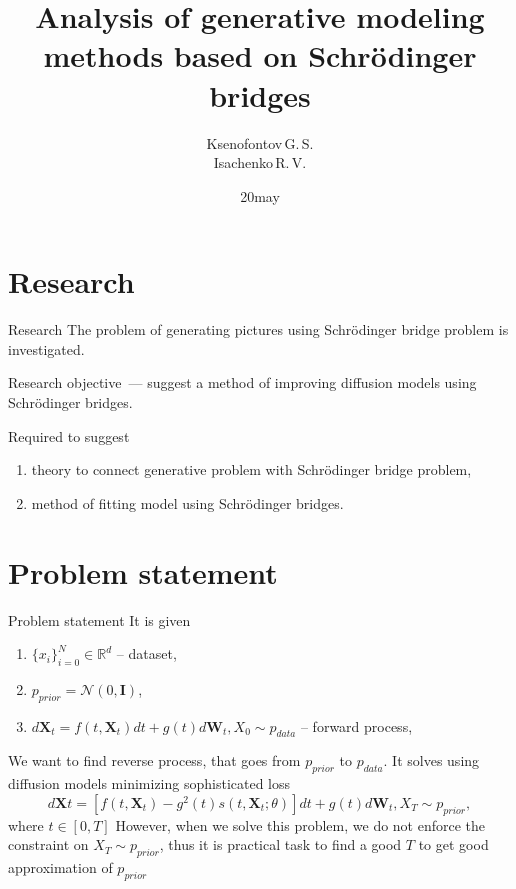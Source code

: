 \documentclass[10pt,pdf,hyperref={unicode}]{beamer}
\title[]{Analysis of generative modeling methods based on Schrödinger bridges}
\author{Ksenofontov\,G.\,S.\\[1ex] 
\small Isachenko\,R.\,V.}
\institute[]{Moscow Institute of Physics and Technology}
\date[2023]{\small 20\;may\;2023}
\begin{document}
\begin{frame}
\titlepage
\end{frame}

\section{Research}
\begin{frame}{Research}
\bigskip
The problem of generating pictures using  Schrödinger bridge problem is investigated.
\begin{block}{Research objective~---}
suggest a method of improving diffusion models using Schrödinger bridges.
\end{block}
\begin{block}{Required to suggest}
\justifying
\begin{enumerate}[1.]
    \item theory to connect generative problem with Schrödinger bridge problem,
    \item method of fitting model using Schrödinger bridges.
\end{enumerate}
\end{block}
\end{frame}
\section{Problem statement}
\begin{frame}{Problem statement}
It is given
\begin{enumerate}[1.]
    \item $\{x_i\}_{i=0}^N \in \mathbb{R}^d$ -- dataset,
    \item $p_{prior}= \mathcal{N}(0, \textbf{I})$,
    \item $d\textbf{X}_t = f(t, \textbf{X}_t)dt + g(t)d\textbf{W}_t, X_0 \sim p_{data}$ -- forward process,
\end{enumerate}


\bigskip
We want to find reverse process, that goes from $p_{prior}$ to $p_{data}$. It solves using diffusion models minimizing sophisticated loss
$$d\textbf{X}t = [f(t, \textbf{X}_t) - g^2(t) s(t, \textbf{X}_t; \theta)]dt + g(t)d\textbf{W}_t, X_T \sim p_{prior},$$
where $t \in [0, T]$
However, when we solve this problem, we do not enforce the constraint on $X_T \sim p_{prior}$, thus it is practical task to find a good $T$ to get good approximation of $p_{prior}$

\end{frame}
\end{document}

